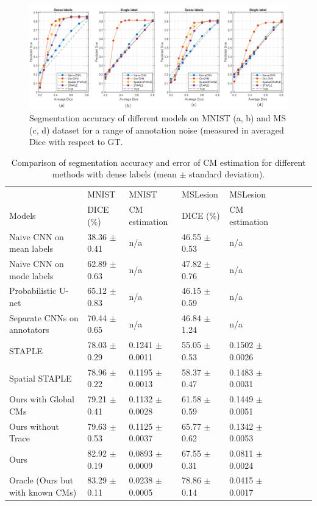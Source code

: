 \begin{figure}[t]
        \center
        \includegraphics[width=\linewidth]{chapter_8/picture3.png}
        \caption{Segmentation accuracy of different models on MNIST (a, b) and MS (c, d) dataset for a range of annotation noise (measured in averaged Dice with respect to GT.}
        \label{plot of denselabel and single label}
\end{figure}

\begin{table}[!h]
	\center
	\scriptsize
	\begin{tabular}{@{}lllllllll}
		\hline
		 & MNIST & MNIST  & MSLesion  & MSLesion  \\
		Models & DICE (\%) & CM estimation & DICE (\%) & CM estimation \\
		\hline	
		Naive CNN on mean labels & 38.36 $\pm$ 0.41 &  n/a & 46.55 $\pm$ 0.53 &  n/a  \\
		Naive CNN on mode labels & 62.89 $\pm$ 0.63 &  n/a & 47.82 $\pm$ 0.76 &  n/a  \\
		Probabilistic U-net \cite{kohl2018probabilistic}  & 65.12 $\pm$ 0.83  &  n/a  & 46.15 $\pm$ 0.59  & n/a    \\
		Separate CNNs on annotators & 70.44 $\pm$ 0.65 & n/a & 46.84 $\pm$ 1.24 & n/a &   \\ 
		STAPLE \cite{warfield2004simultaneous}& 78.03 $\pm$ 0.29 &  0.1241 $\pm$ 0.0011 & 55.05 $\pm$ 0.53 &  0.1502 $\pm$ 0.0026 \\ 
		Spatial STAPLE \cite{asman2012formulating} & 78.96 $\pm$ 0.22 &  0.1195 $\pm$ 0.0013 & 58.37 $\pm$ 0.47 &  0.1483 $\pm$ 0.0031  \\
		Ours with Global CMs & 79.21 $\pm$ 0.41  & 0.1132 $\pm$ 0.0028 & 61.58 $\pm$ 0.59   &  0.1449 $\pm$ 0.0051   \\
		Ours without Trace & 79.63 $\pm$ 0.53  &  0.1125 $\pm$ 0.0037 & 65.77 $\pm$ 0.62 &  0.1342 $\pm$ 0.0053  \\
		Ours & 82.92 $\pm$ 0.19 &  0.0893 $\pm$ 0.0009 & 67.55 $\pm$ 0.31 &  0.0811 $\pm$ 0.0024    \\
		Oracle (Ours but with known CMs)   & 83.29 $\pm$ 0.11 & 0.0238 $\pm$ 0.0005 & 78.86 $\pm$ 0.14 &  0.0415 $\pm$ 0.0017   \\ 
		\hline
	\end{tabular}%
\caption{Comparison of segmentation accuracy and error of CM estimation for different methods with dense labels (mean $\pm$ standard deviation).}
\label{denselabel of MNIST and MS}
\end{table}

